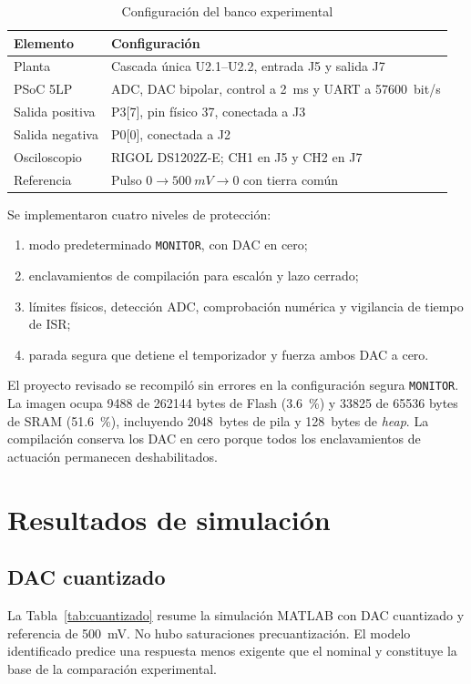 \documentclass[conference]{IEEEtran}
\begin{document}
\begin{table}[!t]
\caption{Configuración del banco experimental}
\label{tab:banco}
\centering
\scriptsize
\begin{tabular}{lp{4.6cm}}
\toprule
Elemento & Configuración\\
\midrule
Planta & Cascada única U2.1--U2.2, entrada J5 y salida J7\\
PSoC 5LP & ADC, DAC bipolar, control a \SI{2}{ms} y UART a 57600~bit/s\\
Salida positiva & P3[7], pin físico 37, conectada a J3\\
Salida negativa & P0[0], conectada a J2\\
Osciloscopio & RIGOL DS1202Z-E; CH1 en J5 y CH2 en J7\\
Referencia & Pulso $0\rightarrow\SI{500}{mV}\rightarrow0$ con tierra común\\
\bottomrule
\end{tabular}
\end{table}

Se implementaron cuatro niveles de protección:
\begin{enumerate}
\item modo predeterminado \texttt{MONITOR}, con DAC en cero;
\item enclavamientos de compilación para escalón y lazo cerrado;
\item límites físicos, detección ADC, comprobación numérica y vigilancia de tiempo de ISR;
\item parada segura que detiene el temporizador y fuerza ambos DAC a cero.
\end{enumerate}

El proyecto revisado se recompiló sin errores en la configuración segura \texttt{MONITOR}. La imagen ocupa 9488 de 262144 bytes de Flash (\SI{3.6}{\percent}) y 33825 de 65536 bytes de SRAM (\SI{51.6}{\percent}), incluyendo \SI{2048}{bytes} de pila y \SI{128}{bytes} de \emph{heap}. La compilación conserva los DAC en cero porque todos los enclavamientos de actuación permanecen deshabilitados.

\section{Resultados de simulación}
\subsection{DAC cuantizado}
La Tabla~\ref{tab:cuantizado} resume la simulación MATLAB con DAC cuantizado y referencia de \SI{500}{mV}. No hubo saturaciones precuantización. El modelo identificado predice una respuesta menos exigente que el nominal y constituye la base de la comparación experimental.
\end{document}
